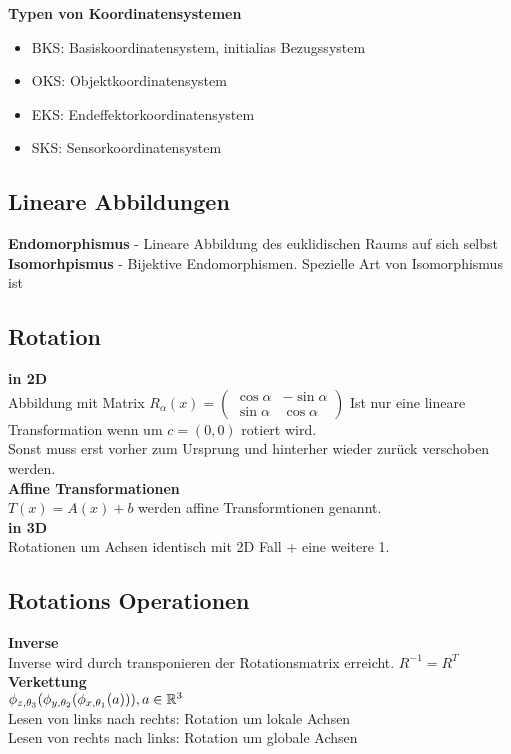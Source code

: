 \textbf{Typen von Koordinatensystemen}
\begin{itemize}
  \item BKS: Basiskoordinatensystem, initialias Bezugssystem
  \item OKS: Objektkoordinatensystem
  \item EKS: Endeffektorkoordinatensystem
  \item SKS: Sensorkoordinatensystem
\end{itemize}

\subsection{Lineare Abbildungen}
\textbf{Endomorphismus} - Lineare Abbildung des euklidischen Raums auf sich selbst\\
\textbf{Isomorhpismus} - Bijektive Endomorphismen. Spezielle Art von Isomorphismus ist \SO

\subsection{Rotation}
\textbf{in 2D}\\
Abbildung mit Matrix \(R_\alpha(x) = \begin{pmatrix} \cos \alpha & -\sin\alpha \\ \sin \alpha & \cos \alpha\end{pmatrix}\)
Ist nur eine lineare Transformation wenn um \(c=(0,0)\) rotiert wird.\\
Sonst muss erst vorher zum Ursprung und hinterher wieder zurück verschoben werden.\\
\textbf{Affine Transformationen}\\
\(T(x) = A(x) + b\) werden affine Transformtionen genannt.\\

\textbf{in 3D}\\
Rotationen um Achsen identisch mit 2D Fall + eine weitere 1.

\subsection{Rotations Operationen}
\textbf{Inverse}\\
Inverse wird durch transponieren der Rotationsmatrix erreicht. \(R^{-1} = R^T\)\\
\textbf{Verkettung}\\
\(\phi_{z, \theta_3}(\phi_{y, \theta_2}(\phi_{x, \theta_1}(a))), a \in \mathbb{R}^3\)\\
Lesen von links nach rechts: Rotation um lokale Achsen\\
Lesen von rechts nach links: Rotation um globale Achsen\\

